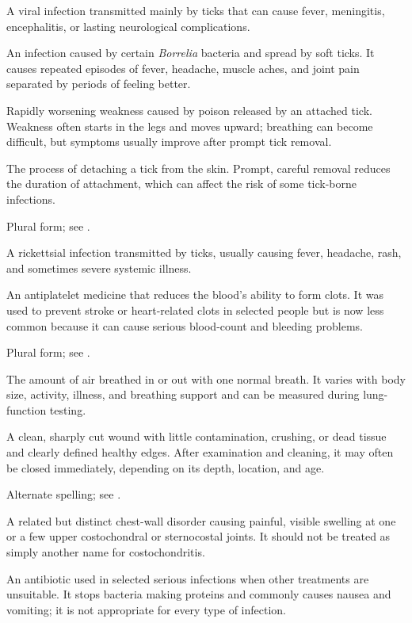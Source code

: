  A viral infection transmitted mainly by ticks that can cause fever, meningitis, encephalitis, or lasting neurological complications.

 An infection caused by certain \textit{Borrelia} bacteria and spread by soft ticks. It causes repeated episodes of fever, headache, muscle aches, and joint pain separated by periods of feeling better.

 Rapidly worsening weakness caused by poison released by an attached tick. Weakness often starts in the legs and moves upward; breathing can become difficult, but symptoms usually improve after prompt tick removal.

 The process of detaching a tick from the skin. Prompt, careful removal reduces the duration of attachment, which can affect the risk of some tick-borne infections.

 Plural form; see .

 A rickettsial infection transmitted by ticks, usually causing fever, headache, rash, and sometimes severe systemic illness.

 An antiplatelet medicine that reduces the blood’s ability to form clots. It was used to prevent stroke or heart-related clots in selected people but is now less common because it can cause serious blood-count and bleeding problems.

 Plural form; see .

 The amount of air breathed in or out with one normal breath. It varies with body size, activity, illness, and breathing support and can be measured during lung-function testing.

 A clean, sharply cut wound with little contamination, crushing, or dead tissue and clearly defined healthy edges. After examination and cleaning, it may often be closed immediately, depending on its depth, location, and age.

 Alternate spelling; see .

 A related but distinct chest-wall disorder causing painful, visible swelling at one or a few upper costochondral or sternocostal joints. It should not be treated as simply another name for costochondritis.

 An antibiotic used in selected serious infections when other treatments are unsuitable. It stops bacteria making proteins and commonly causes nausea and vomiting; it is not appropriate for every type of infection.

